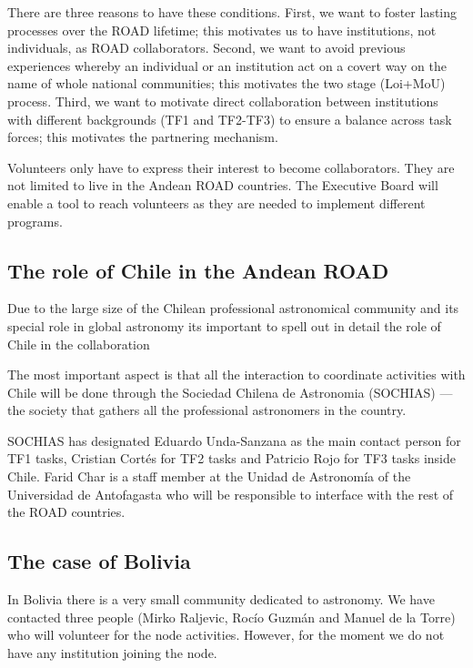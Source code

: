 \documentclass[12pt]{article}
\begin{document}
There are three reasons to have these conditions. First, we want to
foster lasting processes over the ROAD lifetime; this motivates us to
have institutions, not individuals, as ROAD collaborators. Second, we want
to avoid previous experiences whereby an individual or an institution
act on a covert way on the name of whole national communities; this
motivates the two stage (Loi+MoU) process. Third, we want to motivate
direct collaboration between institutions with different backgrounds
(TF1 and TF2-TF3) to ensure a balance across task forces; this
motivates the partnering mechanism.  

Volunteers only have to express their interest to become
collaborators. They are not limited to live in the Andean ROAD
countries. The Executive Board will enable a tool to reach volunteers
as they are needed to implement different programs.  

\subsection*{The role of Chile in the Andean ROAD}

Due to the large size of the Chilean professional astronomical
community and its special role in global astronomy its important to
spell out in detail the role of Chile in the collaboration

The most important aspect is that all the interaction to coordinate
activities with Chile will be done through the Sociedad Chilena de
Astronomia (SOCHIAS) --- the society that gathers all the professional
astronomers in the country.

SOCHIAS has designated Eduardo Unda-Sanzana as the main contact
person for TF1 tasks, Cristian Cort\'es for TF2 tasks and Patricio
Rojo for TF3 tasks inside Chile. Farid Char is a staff member at the
Unidad de Astronomía of the Universidad de Antofagasta who will be
responsible to interface with the rest of the ROAD countries. 


\subsection*{The case of Bolivia}

In Bolivia there is a very small community dedicated to
astronomy. We have contacted three people (Mirko Raljevic, Roc\'io
Guzm\'an and Manuel de la Torre) who will volunteer for the node
activities. However, for the moment we do not have any institution
joining the node.

\appendixpage
\appendix
\end{document}
